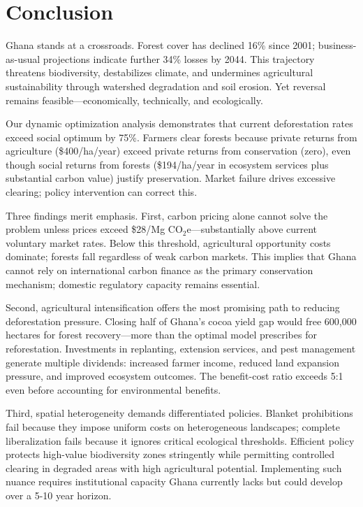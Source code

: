 \section{Conclusion}

Ghana stands at a crossroads. Forest cover has declined 16\% since 2001; business-as-usual projections indicate further 34\% losses by 2044. This trajectory threatens biodiversity, destabilizes climate, and undermines agricultural sustainability through watershed degradation and soil erosion. Yet reversal remains feasible—economically, technically, and ecologically.

Our dynamic optimization analysis demonstrates that current deforestation rates exceed social optimum by 75\%. Farmers clear forests because private returns from agriculture (\$400/ha/year) exceed private returns from conservation (zero), even though social returns from forests (\$194/ha/year in ecosystem services plus substantial carbon value) justify preservation. Market failure drives excessive clearing; policy intervention can correct this.

Three findings merit emphasis. First, carbon pricing alone cannot solve the problem unless prices exceed \$28/Mg CO$_2$e—substantially above current voluntary market rates. Below this threshold, agricultural opportunity costs dominate; forests fall regardless of weak carbon markets. This implies that Ghana cannot rely on international carbon finance as the primary conservation mechanism; domestic regulatory capacity remains essential.

Second, agricultural intensification offers the most promising path to reducing deforestation pressure. Closing half of Ghana's cocoa yield gap would free 600,000 hectares for forest recovery—more than the optimal model prescribes for reforestation. Investments in replanting, extension services, and pest management generate multiple dividends: increased farmer income, reduced land expansion pressure, and improved ecosystem outcomes. The benefit-cost ratio exceeds 5:1 even before accounting for environmental benefits.

Third, spatial heterogeneity demands differentiated policies. Blanket prohibitions fail because they impose uniform costs on heterogeneous landscapes; complete liberalization fails because it ignores critical ecological thresholds. Efficient policy protects high-value biodiversity zones stringently while permitting controlled clearing in degraded areas with high agricultural potential. Implementing such nuance requires institutional capacity Ghana currently lacks but could develop over a 5-10 year horizon.

